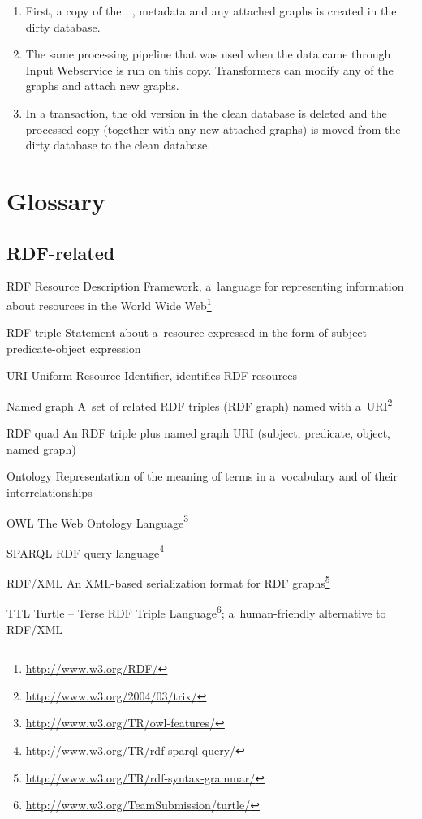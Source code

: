 \begin{enumerate}
  \item First, a copy of the , , metadata and any attached graphs is created in the dirty database.
  \item The same processing pipeline that was used when the data came through Input Webservice is run on this copy. Transformers can modify any of the graphs and attach new graphs.
  \item In a transaction, the old version in the clean database is deleted and the processed copy (together with any new attached graphs) is moved from the dirty database to the clean database.
\end{enumerate}

\appendix

\chapter{Glossary}

\section*{RDF-related}
\begin{glossarylist}
	\item[RDF] Resource Description Framework, a~language for representing information about resources in the World Wide Web\footnote{\url{http://www.w3.org/RDF/}}
	\item[RDF triple] Statement about a~resource expressed in the form of subject-predicate-object expression
	\item[URI] Uniform Resource Identifier, identifies RDF resources
	\item[Named graph] A~set of related RDF triples (RDF graph) named with a~URI\footnote{\url{http://www.w3.org/2004/03/trix/}}
	\item[RDF quad] An RDF triple plus named graph URI (subject, predicate, object, named graph)
	\item[Ontology] Representation of the meaning of terms in a~vocabulary and of their interrelationships
	\item[OWL] The Web Ontology Language\footnote{\url{http://www.w3.org/TR/owl-features/}}
	\item[SPARQL] RDF query language\footnote{\url{http://www.w3.org/TR/rdf-sparql-query/}}
	\item[RDF/XML] An XML-based serialization format for RDF graphs\footnote{\url{http://www.w3.org/TR/rdf-syntax-grammar/}}
	\item[TTL] Turtle -- Terse RDF Triple Language\footnote{\url{http://www.w3.org/TeamSubmission/turtle/}}; a~human-friendly alternative to RDF/XML 
\end{glossarylist}

